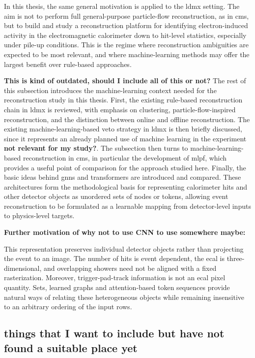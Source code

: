 In this thesis, the same general motivation is applied to the \gls{ldmx} setting. The aim is not to perform full general-purpose particle-flow reconstruction, as in \gls{cms}, but to build and study a reconstruction platform for identifying electron-induced activity in the electromagnetic calorimeter down to hit-level statistics, especially under pile-up conditions. This is the regime where reconstruction ambiguities are expected to be most relevant, and where machine-learning methods may offer the largest benefit over rule-based approaches.

\textbf{This is kind of outdated, should I include all of this or not?} The rest of this subsection introduces the machine-learning context needed for the reconstruction study in this thesis. First, the existing rule-based reconstruction chain in \gls{ldmx} is reviewed, with emphasis on clustering, particle-flow-inspired reconstruction, and the distinction between online and offline reconstruction. The existing machine-learning-based veto strategy in \gls{ldmx} is then briefly discussed, since it represents an already planned use of machine learning in the experiment \textbf{not relevant for my study?}. The subsection then turns to machine-learning-based reconstruction in \gls{cms}, in particular the development of \gls{mlpf}, which provides a useful point of comparison for the approach studied here. Finally, the basic ideas behind \glspl{gnn} and transformers are introduced and compared. These architectures form the methodological basis for representing calorimeter hits and other detector objects as unordered sets of nodes or tokens, allowing event reconstruction to be formulated as a learnable mapping from detector-level inputs to physics-level targets.

\textbf{Further motivation of why not to use CNN to use somewhere maybe:}

This representation preserves individual detector objects rather than
projecting the event to an image. The number of hits is event dependent, the
\gls{ecal} is three-dimensional, and overlapping showers need not be aligned
with a fixed rasterization. Moreover, trigger-pad-track information is not an
\gls{ecal} pixel quantity. Sets, learned graphs and attention-based token
sequences provide natural ways of relating these heterogeneous objects while
remaining insensitive to an arbitrary ordering of the input rows.

\subsection{things that I want to include but have not found a suitable place yet}


